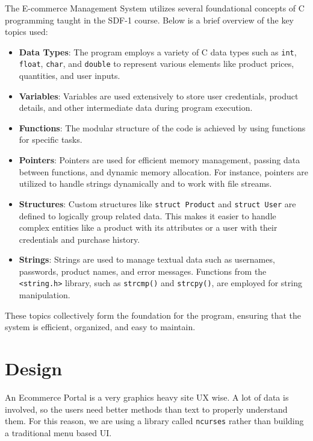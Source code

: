 \documentclass[12pt,a4paper]{article}
\begin{document}
The E-commerce Management System utilizes several foundational concepts of C programming taught in the SDF-1 course. Below is a brief overview of the key topics used:

\begin{itemize}
    \item \textbf{Data Types}: The program employs a variety of C data types such as \texttt{int}, \texttt{float}, \texttt{char}, and \texttt{double} to represent various elements like product prices, quantities, and user inputs.
    
    \item \textbf{Variables}: Variables are used extensively to store user credentials, product details, and other intermediate data during program execution.
    \item \textbf{Functions}: The modular structure of the code is achieved by using functions for specific tasks.

    \item \textbf{Pointers}: Pointers are used for efficient memory management, passing data between functions, and dynamic memory allocation. For instance, pointers are utilized to handle strings dynamically and to work with file streams.

    \item \textbf{Structures}: Custom structures like \texttt{struct Product} and \texttt{struct User} are defined to logically group related data. This makes it easier to handle complex entities like a product with its attributes or a user with their credentials and purchase history.

    \item \textbf{Strings}: Strings are used to manage textual data such as usernames, passwords, product names, and error messages. Functions from the \texttt{<string.h>} library, such as \texttt{strcmp()} and \texttt{strcpy()}, are employed for string manipulation.
\end{itemize}

These topics collectively form the foundation for the program, ensuring that the system is efficient, organized, and easy to maintain.

\newpage
\section{Design}

An Ecommerce Portal is a very graphics heavy site UX wise. A lot of data is involved, so the users need better methods than text to properly understand them. For this reason, we are using a library called \texttt{ncurses} rather than building a traditional menu based UI. \\
\end{document}
